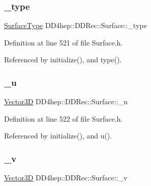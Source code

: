 \subsubsection{\texorpdfstring{\+\_\+type}{\_type}}
{\footnotesize\ttfamily \hyperlink{class_d_d_surfaces_1_1_surface_type}{Surface\+Type} D\+D4hep\+::\+D\+D\+Rec\+::\+Surface\+::\+\_\+type\hspace{0.3cm}{\ttfamily [protected]}}



Definition at line 521 of file Surface.\+h.



Referenced by initialize(), and type().

\hypertarget{class_d_d4hep_1_1_d_d_rec_1_1_surface_abbf2e76e33b536bac67c387b860c1ff4}{}\label{class_d_d4hep_1_1_d_d_rec_1_1_surface_abbf2e76e33b536bac67c387b860c1ff4} 
\subsubsection{\texorpdfstring{\+\_\+u}{\_u}}
{\footnotesize\ttfamily \hyperlink{class_d_d_surfaces_1_1_vector3_d}{Vector3D} D\+D4hep\+::\+D\+D\+Rec\+::\+Surface\+::\+\_\+u\hspace{0.3cm}{\ttfamily [protected]}}



Definition at line 522 of file Surface.\+h.



Referenced by initialize(), and u().

\hypertarget{class_d_d4hep_1_1_d_d_rec_1_1_surface_a12656a8ed5ccc5a1993e1bacf9d4624b}{}\label{class_d_d4hep_1_1_d_d_rec_1_1_surface_a12656a8ed5ccc5a1993e1bacf9d4624b} 
\subsubsection{\texorpdfstring{\+\_\+v}{\_v}}
{\footnotesize\ttfamily \hyperlink{class_d_d_surfaces_1_1_vector3_d}{Vector3D} D\+D4hep\+::\+D\+D\+Rec\+::\+Surface\+::\+\_\+v\hspace{0.3cm}{\ttfamily [protected]}}



